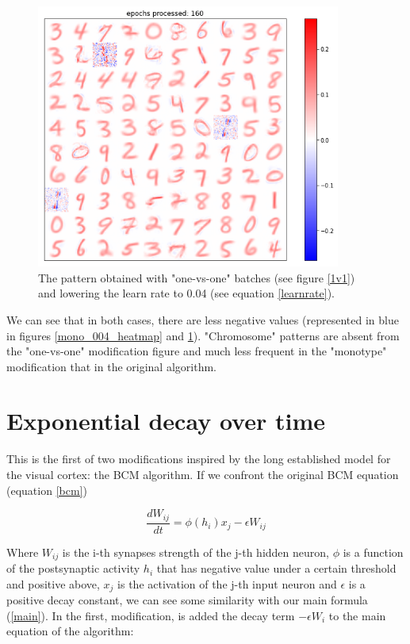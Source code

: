 \documentclass[a4paper]{report}
\begin{document}
\begin{figure} [H]
	\centering
	\includegraphics [width=10cm] {h/1v1.png}
	\caption{The pattern obtained with "one-vs-one" batches (see figure \ref{1v1}) and lowering the learn rate to 0.04 (see equation \ref{learnrate}).}
	\label{1v1_004_heatmap}
\end{figure}

We can see that in both cases, there are less negative values (represented in blue in figures \ref{mono_004_heatmap} and \ref{1v1_004_heatmap}). "Chromosome" patterns are absent from the "one-vs-one" modification figure and much less frequent in the "monotype" modification that in the original algorithm.

\section{Exponential decay over time}

This is the first of two modifications inspired by the long established model for the visual cortex:
the BCM algorithm.
If we confront the original BCM equation (equation \ref{bcm})

\begin{equation}
    \frac{dW_{ij}}{dt} = \phi(h_i)x_{j} - \epsilon W_{ij}
    \label{bcm}
\end{equation}

Where $W_{ij}$ is the i-th synapses strength of the j-th hidden neuron, $\phi$ is a function of the postsynaptic activity $h_i$ that has negative value under a certain threshold and positive above, $x_{j}$ is the activation of the j-th input neuron and $\epsilon$ is a positive decay constant, we can see some similarity with our main formula (\ref{main}).
In the first, modification, is added the decay term $-\epsilon W_i$ to the main equation of the algorithm:
\end{document}

